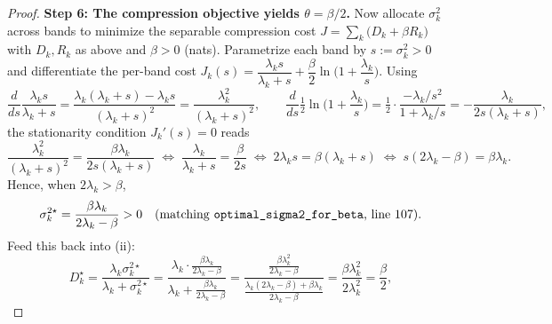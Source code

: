 \begin{proof}
\medskip
\noindent\textbf{Step 6: The compression objective yields $\theta=\beta/2$.}
Now allocate $\sigma_k^2$ across bands to minimize the separable compression cost $J=\sum_k\big(D_k+\beta R_k\big)$ with $D_k,R_k$ as above and $\beta>0$ (nats). Parametrize each band by $s:=\sigma_k^2>0$ and differentiate the per-band cost
$J_k(s)=\dfrac{\lambda_k s}{\lambda_k+s}+\dfrac{\beta}{2}\ln\!\Big(1+\dfrac{\lambda_k}{s}\Big)$.
Using
\[
\frac{d}{ds}\frac{\lambda_k s}{\lambda_k+s}=\frac{\lambda_k(\lambda_k+s)-\lambda_k s}{(\lambda_k+s)^2}=\frac{\lambda_k^2}{(\lambda_k+s)^2},
\qquad
\frac{d}{ds}\tfrac12\ln\!\Big(1+\frac{\lambda_k}{s}\Big)=\tfrac12\cdot\frac{-\lambda_k/s^2}{1+\lambda_k/s}=-\frac{\lambda_k}{2s(\lambda_k+s)},
\]
the stationarity condition $J_k'(s)=0$ reads
\[
\frac{\lambda_k^2}{(\lambda_k+s)^2}=\frac{\beta\lambda_k}{2s(\lambda_k+s)}
\;\Longleftrightarrow\;
\frac{\lambda_k}{\lambda_k+s}=\frac{\beta}{2s}
\;\Longleftrightarrow\;
2\lambda_k s=\beta(\lambda_k+s)
\;\Longleftrightarrow\;
s(2\lambda_k-\beta)=\beta\lambda_k .
\]
Hence, when $2\lambda_k>\beta$,
\[
\sigma_k^{2\star}=\frac{\beta\lambda_k}{2\lambda_k-\beta}>0
\quad(\text{matching \texttt{optimal\_sigma2\_for\_beta}, line~107}).
\]
Feed this back into (ii):
\[
D_k^\star=\frac{\lambda_k\sigma_k^{2\star}}{\lambda_k+\sigma_k^{2\star}}
=\frac{\lambda_k\cdot\frac{\beta\lambda_k}{2\lambda_k-\beta}}{\lambda_k+\frac{\beta\lambda_k}{2\lambda_k-\beta}}
=\frac{\frac{\beta\lambda_k^2}{2\lambda_k-\beta}}{\frac{\lambda_k(2\lambda_k-\beta)+\beta\lambda_k}{2\lambda_k-\beta}}
=\frac{\beta\lambda_k^2}{2\lambda_k^2}
=\frac{\beta}{2},
\]

\end{proof}

